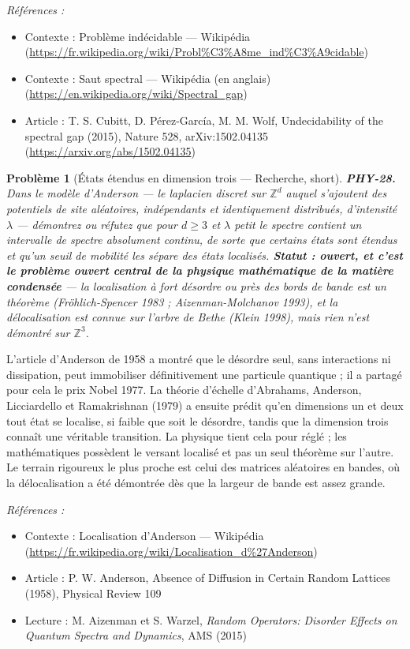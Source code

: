 \documentclass[11pt]{article}
\newtheorem{problem}{Problème}
\newenvironment{refs}{\par\small\noindent\emph{Références :}\begin{itemize}\setlength\itemsep{0pt}}{\end{itemize}\normalsize}
\begin{document}
\begin{refs}
\item Contexte : Problème indécidable --- Wikipédia (\url{https://fr.wikipedia.org/wiki/Probl%C3%A8me_ind%C3%A9cidable})
\item Contexte : Saut spectral --- Wikipédia (en anglais) (\url{https://en.wikipedia.org/wiki/Spectral_gap})
\item Article : T. S. Cubitt, D. Pérez-García, M. M. Wolf, \og{} Undecidability of the spectral gap \fg{} (2015), Nature 528, arXiv:1502.04135 (\url{https://arxiv.org/abs/1502.04135})
\end{refs}

\bigskip

\begin{problem}[{États étendus en dimension trois --- Recherche, short}]
\textbf{PHY-28.} Dans le modèle d'Anderson --- le laplacien discret sur
$\mathbb{Z}^d$ auquel s'ajoutent des potentiels de site aléatoires, indépendants et identiquement
distribués, d'intensité $\lambda$ --- démontrez ou réfutez que pour $d \ge 3$ et $\lambda$
petit le spectre contient un intervalle de spectre absolument continu, de sorte que certains états
sont étendus et qu'un seuil de mobilité les sépare des états localisés. \textbf{Statut : ouvert, et
c'est le problème ouvert central de la physique mathématique de la matière condensée} --- la
localisation à fort désordre ou près des bords de bande est un théorème (Fröhlich-Spencer 1983 ;
Aizenman-Molchanov 1993), et la délocalisation est connue sur l'arbre de Bethe (Klein 1998), mais
rien n'est démontré sur $\mathbb{Z}^3$.
\end{problem}

\noindent L'article d'Anderson de 1958 a montré que le désordre seul, sans interactions
ni dissipation, peut immobiliser définitivement une particule quantique ; il a partagé pour cela
le prix Nobel 1977. La théorie d'échelle d'Abrahams, Anderson, Licciardello et Ramakrishnan (1979)
a ensuite prédit qu'en dimensions un et deux tout état se localise, si faible que soit le
désordre, tandis que la dimension trois connaît une véritable transition. La physique tient cela
pour réglé ; les mathématiques possèdent le versant localisé et pas un seul théorème sur l'autre.
Le terrain rigoureux le plus proche est celui des matrices aléatoires en bandes, où la
délocalisation a été démontrée dès que la largeur de bande est assez grande.

\begin{refs}
\item Contexte : Localisation d'Anderson --- Wikipédia (\url{https://fr.wikipedia.org/wiki/Localisation_d%27Anderson})
\item Article : P. W. Anderson, \og{} Absence of Diffusion in Certain Random Lattices \fg{} (1958), Physical Review 109
\item Lecture : M. Aizenman et S. Warzel, \textit{Random Operators: Disorder Effects on Quantum Spectra and Dynamics}, AMS (2015)
\end{refs}
\end{document}
